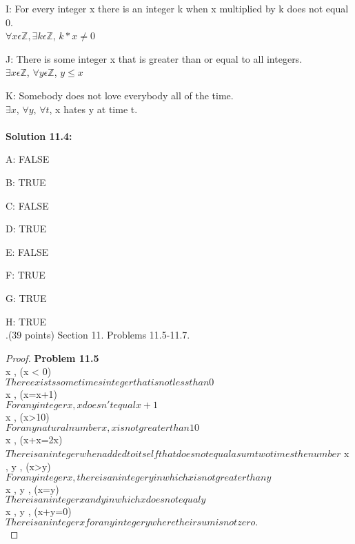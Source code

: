 \documentclass[12pt]{article}
\begin{document}
 \item I: For every integer x there is an integer k when x multiplied by k does not equal 0. \\ 
 $\forall x \epsilon \mathbb{Z}, \exists k \epsilon \mathbb{Z}$, $k*x \neq 0$

\item J: There is some integer x that is greater than or equal to all integers. \\ 
$\exists x \epsilon \mathbb{Z}$, $\forall y \epsilon \mathbb{Z}$, $y \leq x$
\item K: Somebody does not love everybody all of the time. \\ 
$\exists x$, $\forall y$, $\forall t$, x hates y at time t. \\ 


\\
\textbf{Solution 11.4:}
\item A: FALSE
\item B: TRUE
\item C: FALSE
\item D: TRUE
\item E: FALSE
\item F: TRUE
\item G: TRUE
\item H: TRUE \\ 


.(39 points)  Section 11.  Problems 11.5-11.7.
\vspace{.25in} 

\begin{proof} 
\textbf{Problem 11.5}\\
 \exists x \in {}, \neg(x < 0) \\
$There exists sometimes integer that is not less than 0$ \\
 \forall x \in {}, \neg(x=x+1)\\
$For any integer x, x doesn't equal x+1 $\\
 \forall x \in {}, \neg(x>10)\\
$For any natural number x , x is not greater than 10$\\
 \exists x \in {}, \neg(x+x=2x) \\
$There is an integer when added to itself that does not equal a sum two times the number$
 \forall x \in {}, \exists y \in {}, \neg(x>y)\\
$For any integer x, there is an integer y in which x is not greater than y$\\
 \exists x \in {}, \exists y \in {}, \neg(x=y) \\
$There is an integer x and y in which x does not equal y$\\
 \exists x \in {}, \forall y \in {}, \neg(x+y=0)\\
$There is an integer x for any integer y where their sum is not zero.$\\
\end{proof}
\end{document}
